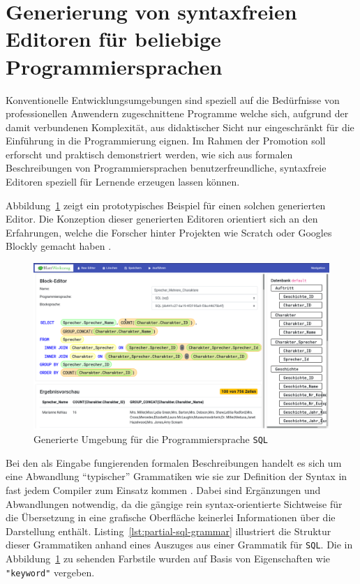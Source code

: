 \documentclass[paper=a4,fontsize=12pt,parskip=half]{scrartcl}
\begin{document}
\section*{Generierung von syntaxfreien Editoren für beliebige Programmiersprachen}

Konventionelle Entwicklungsumgebungen sind speziell auf die Bedürfnisse von professionellen Anwendern zugeschnittene Programme welche sich, aufgrund der damit verbundenen Komplexität, aus didaktischer Sicht nur eingeschränkt für die Einführung in die Programmierung eignen. Im Rahmen der Promotion soll erforscht und praktisch demonstriert werden, wie sich aus formalen Beschreibungen von Programmiersprachen benutzerfreundliche, syntaxfreie Editoren speziell für Lernende erzeugen lassen können.

Abbildung~\ref{fig:example-sql-ide} zeigt ein prototypisches Beispiel für einen solchen generierten Editor. Die Konzeption dieser generierten Editoren orientiert sich an den Erfahrungen, welche die Forscher hinter Projekten wie Scratch \cite{resnick_scratch:_2009} oder Googles Blockly gemacht haben \cite{fraser_ten_2015}.

\begin{figure}[p]
  \includegraphics[width=\linewidth]{screenshot-drag-drop-ide.png}
  \caption{Generierte Umgebung für die Programmiersprache \texttt{SQL}}
  \label{fig:example-sql-ide}
\end{figure}



Bei den als Eingabe fungierenden formalen Beschreibungen handelt es sich um eine Abwandlung \enquote{typischer} Grammatiken wie sie zur Definition der Syntax in fast jedem Compiler zum Einsatz kommen \cite[S. 42ff]{aho_compilers:_2007}. Dabei sind Ergänzungen und Abwandlungen notwendig, da die gängige rein syntax-orientierte Sichtweise für die Übersetzung in eine grafische Oberfläche keinerlei Informationen über die Darstellung enthält. Listing~\ref{lst:partial-sql-grammar} illustriert die Struktur dieser Grammatiken anhand eines Auszuges aus einer Grammatik für \texttt{SQL}. Die in Abbildung~\ref{fig:example-sql-ide} zu sehenden Farbstile wurden auf Basis von Eigenschaften wie \texttt{"keyword"} vergeben.
\end{document}
